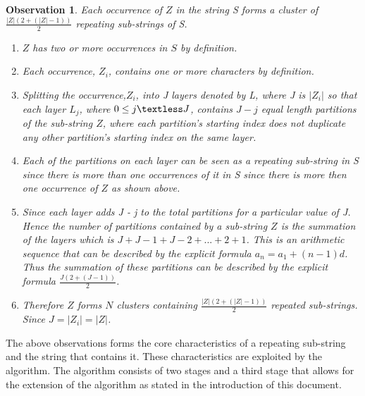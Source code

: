 \documentclass[12pt]{article}
\newtheorem{obser}{Observation}[section]
\begin{document}
\begin{obser}
Each occurrence of $Z$ in the string S forms a cluster of $\frac{|Z|(2 + (|Z|-1))}{2}$ repeating sub-strings of S.
	\begin{enumerate}
		\item $Z$ has two or more occurrences in $S$ by definition.
		\item Each occurrence, $Z_{i}$, contains one or more characters by definition.
		\item Splitting the occurrence,$Z_{i}$, into J layers denoted by L, where J is $|Z_{i}|$ so that each layer $L_{j}$, where $0 \leq j \textless J $, contains $J - j$ equal length partitions of the sub-string $Z$, where each partition's starting index does not duplicate any other partition's starting index on the same layer.
		\item Each of the partitions on each layer can be seen as a repeating sub-string in S since there is more than one occurrences of it in S since there is more then one occurrence of $Z$ as shown above. 
		\item Since each layer adds J - j to the total partitions for a particular value of J. Hence the number of partitions contained by a sub-string $Z$ is the summation of the layers which is $J + J - 1 + J - 2 + ... + 2 + 1$. This is an arithmetic sequence that can be described by the explicit formula $a_{n} = a_{1} + (n - 1)d$. Thus the summation of these partitions can be described by the explicit formula $\frac{J(2 + (J-1))}{2}$. 
		\item Therefore $Z$ forms $N$ clusters containing $\frac{|Z|(2 + (|Z|-1))}{2}$ repeated sub-strings. Since $J = |Z_{i}| = |Z|$.
		      
	\end{enumerate}	
\end{obser}

The above observations forms the core characteristics of a repeating sub-string and the string that contains it. These characteristics are exploited by the algorithm. The algorithm consists of two stages and a third stage that allows for the extension of the algorithm as stated in the introduction of this document.
\end{document}
